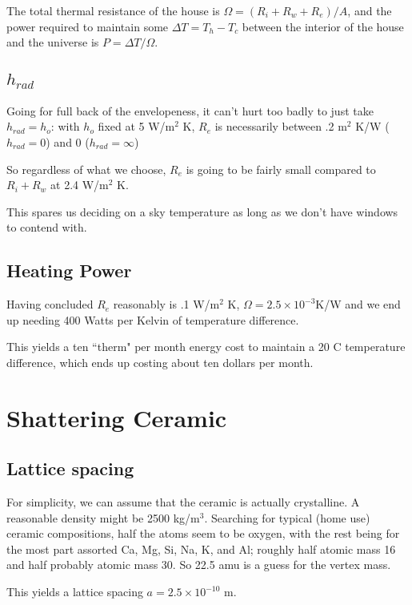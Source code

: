 \documentclass[12pt]{article}
\begin{document}
The total thermal resistance of the house is \(\Omega = (R_i+R_w+R_e)/A \), and the power required to maintain some \(\Delta T = T_h - T_c\) between the interior of the house and the universe is \(P=\Delta T/\Omega\).

\subsection{\(h_{rad}\)}


Going for full back of the envelopeness, it can't hurt too badly to just take \(h_{rad} = h_o\): with \(h_o\) fixed at 5 W/m\(^2\) K, \(R_e\) is necessarily between .2 m\(^2\) K/W  (\(h_{rad} = 0\)) and 0 (\(h_{rad}=\infty\)) 

So regardless of what we choose, \(R_e\) is going to be fairly small compared to \(R_i + R_w\) at 2.4  W/m\(^2\) K.

This spares us deciding on a sky temperature as long as we don't have windows to contend with.

\subsection{Heating Power}

Having concluded \(R_e\) reasonably is .1 W/m\(^2\) K, \(\Omega = 2.5\times10^{-3}\)K/W and we end up needing 400 Watts per Kelvin of temperature difference.

This yields a ten ``therm" per month energy cost to maintain a 20 C temperature difference, which ends up costing about ten dollars per month.

\section{Shattering Ceramic}

\subsection{Lattice spacing}

For simplicity, we can assume that the ceramic is actually crystalline. A reasonable density might be 2500 kg/m\(^3\). Searching for typical (home use) ceramic compositions, half the atoms seem to be oxygen, with the rest being for the most part assorted Ca, Mg, Si, Na, K, and Al; roughly half atomic mass 16 and half probably atomic mass 30. So 22.5 amu is a guess for the vertex mass.

This yields a lattice spacing \(a = 2.5 \times 10^{-10}\) m.
\end{document}
